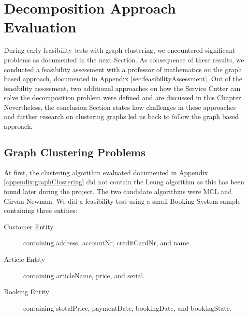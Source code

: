 \chapter{Decomposition Approach Evaluation}
\label{appendix:decompositionAppraoches}

During early feasibility tests with graph clustering, we encountered significant problems as documented in the next Section. As consequence of these results, we conducted a feasibility assessment with a professor of mathematics on the graph based approach, documented in Appendix \ref{sec:feasibilityAssessment}. Out of the feasibility assessment, two additional approaches on how the Service Cutter can solve the decomposition problem were defined and are discussed in this Chapter. Nevertheless, the conclusion Section states how challenges in these approaches and further research on clustering graphs led us back to follow the graph based approach.

\section{Graph Clustering Problems}

At first, the clustering algorithm evaluated documented in Appendix \ref{appendix:graphClustering} did not contain the Leung algorithm as this has been found later during the project. The two candidate algorithms were MCL and Girvan-Newman. We did a feasibility test using a small Booking System sample containing three entities:

\begin{description}
	\item[Customer Entity] containing address, accountNr, creditCardNr, and name.
	\item[Article Entity] containing articleName, price, and serial.
	\item[Booking Entity] containing stotalPrice, paymentDate, bookingDate, and bookingState.
\end{description}

